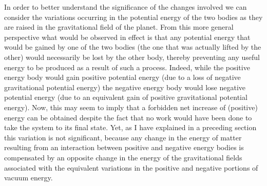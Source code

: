 \documentclass[notitlepage,12pt]{report}
\begin{document}
In order to better understand the significance of the changes involved we can consider the variations occurring in the potential energy of the two bodies as they are raised in the gravitational field of the planet. From this more general perspective what would be observed in effect is that any potential energy that would be gained by one of the two bodies (the one that was actually lifted by the other) would necessarily be lost by the other body, thereby preventing any useful energy to be produced as a result of such a process. Indeed, while the positive energy body would gain positive potential energy (due to a loss of negative gravitational potential energy) the negative energy body would lose negative potential energy (due to an equivalent gain of positive gravitational potential energy). Now, this may seem to imply that a forbidden net increase of (positive) energy can be obtained despite the fact that no work would have been done to take the system to its final state. Yet, as I have explained in a preceding section this variation is not significant, because any change in the energy of matter resulting from an interaction between positive and negative energy bodies is compensated by an opposite change in the energy of the gravitational fields associated with the equivalent variations in the positive and negative portions of vacuum energy.
\end{document}
